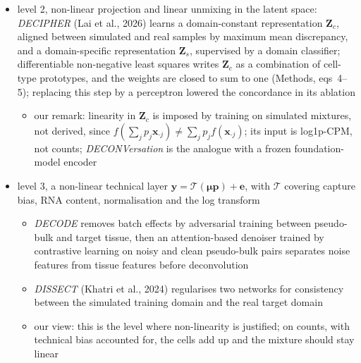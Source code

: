 \begin{itemize}
        drawbacks listed in Section~\ref{sec:latent-space} apply
  \item level 2, non-linear projection and linear unmixing in the latent space: \emph{DECIPHER} (Lai et al., 2026) learns a
        domain-constant representation \(\boldsymbol{Z}_{c}\), aligned between simulated and real samples by maximum mean
        discrepancy, and a domain-specific representation \(\boldsymbol{Z}_{s}\), supervised by a domain classifier;
        differentiable non-negative least squares writes \(\boldsymbol{Z}_{c}\) as a combination of cell-type prototypes,
        and the weights are closed to sum to one (Methods, eqs~4--5); replacing this step by a perceptron lowered the
        concordance in its ablation
  \begin{itemize}
    \item our remark: linearity in \(\boldsymbol{Z}_{c}\) is imposed by training on simulated mixtures, not derived, since
          \(f(\sum_{j}p_{j}\boldsymbol{x}_{\cdot j})\neq\sum_{j}p_{j}f(\boldsymbol{x}_{\cdot j})\); its input is log1p-CPM, not counts;
          \emph{DECONVersation} is the analogue with a frozen foundation-model encoder
          \cite{okuDECONVersationSingleCell2026}
  \end{itemize}
  \item level 3, a non-linear technical layer \(\boldsymbol{y}=\mathcal{T}(\boldsymbol{\mu}\boldsymbol{p})+\boldsymbol{e}\), with
        \(\mathcal{T}\) covering capture bias, RNA content, normalisation and the log transform
  \begin{itemize}
    \item \emph{DECODE} removes batch effects by adversarial training between pseudo-bulk and target tissue, then an
          attention-based denoiser trained by contrastive learning on noisy and clean pseudo-bulk pairs separates
          noise features from tissue features before deconvolution \cite{zhaoDecodeDeepLearningBased2026}
    \item \emph{DISSECT} (Khatri et al., 2024) regularises two networks for consistency between the simulated training domain and the
          real target domain
    \item our view: this is the level where non-linearity is justified; on counts, with technical bias accounted
          for, the cells add up and the mixture should stay linear

\end{itemize}
\end{itemize}
